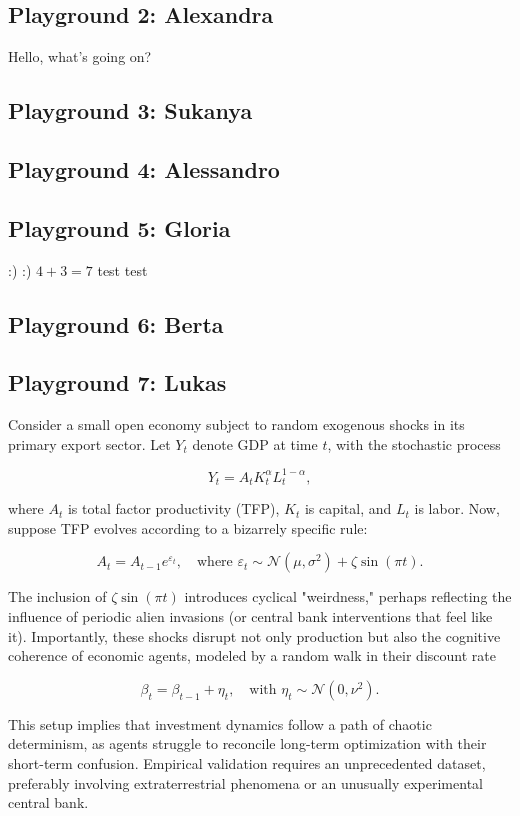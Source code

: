 \documentclass{article}
\begin{document}
\subsection{Playground 2: Alexandra}
Hello, what's going on?  

\subsection{Playground 3: Sukanya}

\subsection{Playground 4: Alessandro}

\subsection{Playground 5: Gloria}
:)
:)
$4+3=7$
test test
\subsection{Playground 6: Berta}

\subsection{Playground 7: Lukas}
Consider a small open economy subject to random exogenous shocks in its primary export sector. Let \( Y_t \) denote GDP at time \( t \), with the stochastic process 

\[
Y_t = A_t K_t^\alpha L_t^{1-\alpha},
\]

where \( A_t \) is total factor productivity (TFP), \( K_t \) is capital, and \( L_t \) is labor. Now, suppose TFP evolves according to a bizarrely specific rule: 

\[
A_t = A_{t-1} e^{\varepsilon_t}, \quad \text{where } \varepsilon_t \sim \mathcal{N}(\mu, \sigma^2) + \zeta \sin(\pi t).
\]

The inclusion of \( \zeta \sin(\pi t) \) introduces cyclical "weirdness," perhaps reflecting the influence of periodic alien invasions (or central bank interventions that feel like it). Importantly, these shocks disrupt not only production but also the cognitive coherence of economic agents, modeled by a random walk in their discount rate 

\[
\beta_t = \beta_{t-1} + \eta_t, \quad \text{with } \eta_t \sim \mathcal{N}(0, \nu^2).
\]

This setup implies that investment dynamics follow a path of chaotic determinism, as agents struggle to reconcile long-term optimization with their short-term confusion. Empirical validation requires an unprecedented dataset, preferably involving extraterrestrial phenomena or an unusually experimental central bank.
\end{document}
